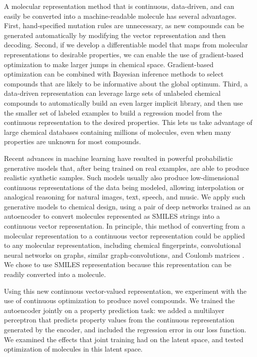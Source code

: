 A molecular representation method that is continuous, data-driven, and can easily be converted into a machine-readable molecule has several advantages. 
First, hand-specified mutation rules are unnecessary, as new compounds can be generated automatically by modifying the vector representation and then decoding.
Second, if we develop a differentiable model that maps from molecular representations to desirable properties, we can enable the use of gradient-based optimization to make larger jumps in chemical space. 
Gradient-based optimization can be combined with Bayesian inference methods to select compounds that are likely to be informative about the global optimum.
Third, a data-driven representation can leverage large sets of unlabeled chemical compounds to automatically build an even larger implicit library, and then use the smaller set of labeled examples to build a regression model from the continuous representation to the desired properties.
This lets us take advantage of large chemical databases containing millions of molecules, even when many properties are unknown for most compounds.

Recent advances in machine learning have resulted in powerful probabilistic generative models that, after being trained on real examples, are able to produce realistic synthetic samples. 
Such models usually also produce low-dimensional continuous representations of the data being modeled, allowing interpolation or analogical reasoning for 
natural images\cite{radford2015unsupervised}, text\cite{bowman2015generating}, speech, and music\cite{vandenoord_2016,Engel2017NeuralAudio}.
We apply such generative models to chemical design, using a pair of deep networks trained as an autoencoder to convert molecules represented as SMILES strings into a continuous vector representation. In principle, this method of converting from a molecular representation to a continuous vector representation could be applied to any molecular representation, including 
chemical fingerprints,\cite{ECFP2010} 
convolutional neural networks on graphs\cite{duvenaud2015convolutional},
 similar graph-convolutions\cite{kearnes_2016_molecular}, and 
 Coulomb matrices \cite{Rupp_2012}. We chose to use SMILES representation because this representation can be readily converted into a molecule.

Using this new continuous vector-valued representation, we experiment with the use of continuous optimization to produce novel compounds. We trained the autoencoder jointly on a property prediction task: we added a multilayer perceptron that predicts property values from the continuous representation generated by the encoder, and included the regression error in our loss function. We examined the effects that joint training had on the latent space, and tested optimization of molecules in this latent space. 


